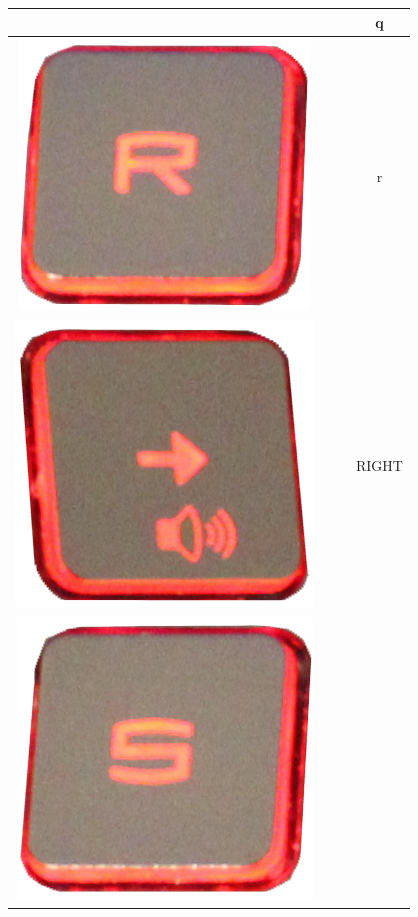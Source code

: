 \begin{longtable}{cccc}
\begin{minipage}[c]{.3\textwidth}
\vspace{0.2cm}
\end{minipage} & & & q\\
\hline
\begin{minipage}[c]{.3\textwidth}
\vspace{0.2cm}
\includegraphics[scale=0.1]{Images/KeyMapping/r}
\vspace{0.2cm}
\end{minipage} & & & r\\
\hline
\begin{minipage}[c]{.3\textwidth}
\vspace{0.2cm}
\includegraphics[scale=0.1]{Images/KeyMapping/RIGHT}
\vspace{0.2cm}
\end{minipage} & & & RIGHT\\
\hline
\begin{minipage}[c]{.3\textwidth}
\vspace{0.2cm}
\includegraphics[scale=0.1]{Images/KeyMapping/s}

\end{minipage}
\end{longtable}
